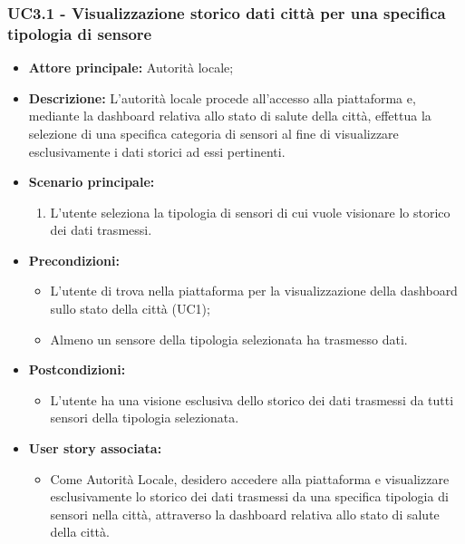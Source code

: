 \documentclass{article}
\begin{document}
\subsubsection{UC3.1 - Visualizzazione storico dati città per una specifica tipologia di sensore}
\begin{itemize}
    \item \textbf{Attore principale:} Autorità locale;
    \item \textbf{Descrizione:} L'autorità locale procede all'accesso alla piattaforma e, mediante la dashboard relativa allo stato di salute della città, effettua la selezione di una specifica categoria di sensori al fine di visualizzare esclusivamente i dati storici ad essi pertinenti.
    \item \textbf{Scenario principale:}
          \begin{enumerate}
              \item L'utente seleziona la tipologia di sensori di cui vuole visionare lo storico dei dati trasmessi.
          \end{enumerate}
    \item \textbf{Precondizioni:}
          \begin{itemize}
              \item  L'utente di trova  nella piattaforma per la visualizzazione della dashboard sullo stato della città (UC1);
              \item  Almeno un sensore della tipologia selezionata ha trasmesso dati.
          \end{itemize}
    \item \textbf{Postcondizioni:}
          \begin{itemize}
              \item  L'utente ha una visione esclusiva dello storico dei dati trasmessi da tutti sensori della tipologia selezionata.
          \end{itemize}
    \item \textbf{User story associata:}
          \begin{itemize}
              \item Come Autorità Locale, desidero accedere alla piattaforma e visualizzare esclusivamente lo storico dei dati trasmessi da una specifica tipologia di sensori nella città, attraverso la dashboard relativa allo stato di salute della città.
          \end{itemize}
\end{itemize}
\end{document}
